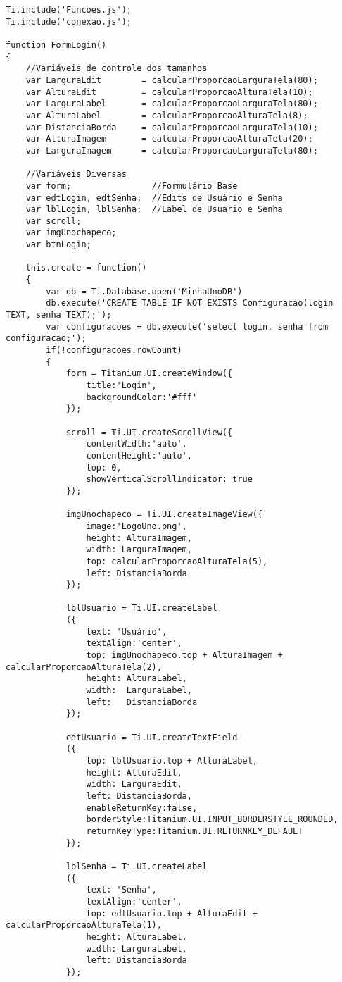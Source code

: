 \begin{lstlisting}
Ti.include('Funcoes.js');
Ti.include('conexao.js');

function FormLogin()
{
	//Variáveis de controle dos tamanhos
	var LarguraEdit        = calcularProporcaoLarguraTela(80);
	var AlturaEdit         = calcularProporcaoAlturaTela(10);
	var LarguraLabel       = calcularProporcaoLarguraTela(80);
	var AlturaLabel        = calcularProporcaoAlturaTela(8);
	var DistanciaBorda     = calcularProporcaoLarguraTela(10);
	var AlturaImagem       = calcularProporcaoAlturaTela(20);
	var LarguraImagem      = calcularProporcaoLarguraTela(80);
	
	//Variáveis Diversas
	var form;                //Formulário Base
	var edtLogin, edtSenha;  //Edits de Usuário e Senha
	var lblLogin, lblSenha;  //Label de Usuario e Senha
	var scroll;
	var imgUnochapeco;
	var btnLogin;
	
	this.create = function()
	{
		var db = Ti.Database.open('MinhaUnoDB')
		db.execute('CREATE TABLE IF NOT EXISTS Configuracao(login TEXT, senha TEXT);');
		var configuracoes = db.execute('select login, senha from configuracao;');
		if(!configuracoes.rowCount)
		{
			form = Titanium.UI.createWindow({  
	    		title:'Login',
	    		backgroundColor:'#fff'
			});
			
			scroll = Ti.UI.createScrollView({
				contentWidth:'auto', 
				contentHeight:'auto', 
				top: 0, 
				showVerticalScrollIndicator: true
			});
			
			imgUnochapeco = Ti.UI.createImageView({
				image:'LogoUno.png',
		    	height: AlturaImagem,
		    	width: LarguraImagem,
		    	top: calcularProporcaoAlturaTela(5),
		    	left: DistanciaBorda
			});
			
			lblUsuario = Ti.UI.createLabel
			({
				text: 'Usuário',
			    textAlign:'center',
			    top: imgUnochapeco.top + AlturaImagem + calcularProporcaoAlturaTela(2),
			  	height: AlturaLabel,
			    width:  LarguraLabel,
			    left:   DistanciaBorda
			});
			
			edtUsuario = Ti.UI.createTextField
			({
			  	top: lblUsuario.top + AlturaLabel,
			    height: AlturaEdit,
			    width: LarguraEdit,
			    left: DistanciaBorda,
			    enableReturnKey:false,
			   	borderStyle:Titanium.UI.INPUT_BORDERSTYLE_ROUNDED,
			   	returnKeyType:Titanium.UI.RETURNKEY_DEFAULT
			});
			
			lblSenha = Ti.UI.createLabel
			({
				text: 'Senha',
			    textAlign:'center',
			    top: edtUsuario.top + AlturaEdit + calcularProporcaoAlturaTela(1),
			    height: AlturaLabel,
			    width: LarguraLabel,
			    left: DistanciaBorda
			});
			

\end{lstlisting}

